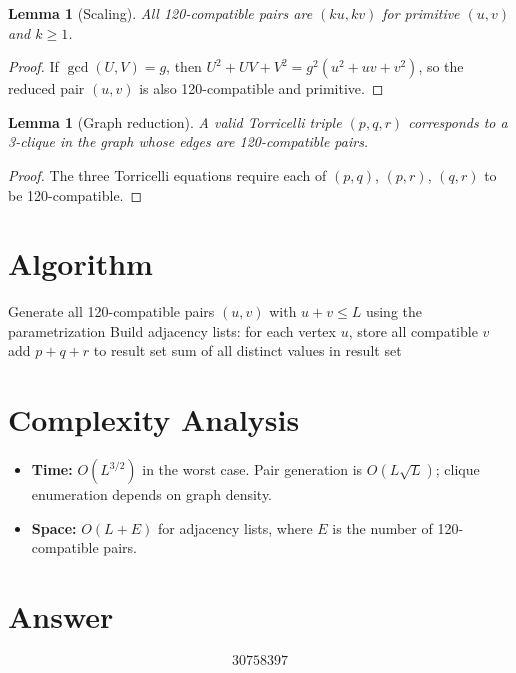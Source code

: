 \documentclass[12pt]{article}
\newtheorem{lemma}[theorem]{Lemma}
\begin{document}
\begin{lemma}[Scaling]
All 120-compatible pairs are $(ku, kv)$ for primitive $(u,v)$ and $k \geq 1$.
\end{lemma}

\begin{proof}
If $\gcd(U,V) = g$, then $U^2+UV+V^2 = g^2(u^2+uv+v^2)$, so the reduced pair $(u,v)$ is also 120-compatible and primitive.
\end{proof}

\begin{lemma}[Graph reduction]
A valid Torricelli triple $(p,q,r)$ corresponds to a 3-clique in the graph whose edges are 120-compatible pairs.
\end{lemma}

\begin{proof}
The three Torricelli equations require each of $(p,q)$, $(p,r)$, $(q,r)$ to be 120-compatible.
\end{proof}

\section{Algorithm}

\begin{algorithmic}[1]
\State Generate all 120-compatible pairs $(u,v)$ with $u+v \leq L$ using the parametrization
\State Build adjacency lists: for each vertex $u$, store all compatible $v$
             add $p+q+r$ to result set \EndIf
        \EndFor
    \EndFor
\EndFor
\State \Return sum of all distinct values in result set
\end{algorithmic}

\section{Complexity Analysis}

\begin{itemize}
\item \textbf{Time:} $O(L^{3/2})$ in the worst case. Pair generation is $O(L \sqrt{L})$; clique enumeration depends on graph density.
\item \textbf{Space:} $O(L + E)$ for adjacency lists, where $E$ is the number of 120-compatible pairs.
\end{itemize}

\section{Answer}

\[
\boxed{30758397}
\]
\end{document}
